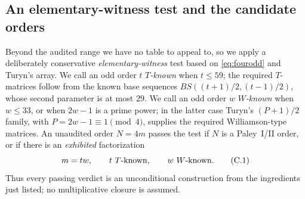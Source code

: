 \documentclass[11pt]{article}
\begin{document}
\subsection{An elementary-witness test and the candidate orders}
\label{app:candidates}

Beyond the audited range we have no table to appeal to, so we apply a
deliberately conservative \emph{elementary-witness} test based on
\eqref{eq:fourodd} and Turyn's array.  We call an odd order \(t\)
\emph{\(T\)-known} when \(t\le59\); the required \(T\)-matrices follow
from the known base sequences
\(BS((t+1)/2,(t-1)/2)\), whose second parameter is at most \(29\).
We call an odd order \(w\) \emph{\(W\)-known} when \(w\le33\), or when
\(2w-1\) is a prime power; in the latter case Turyn's
\((P+1)/2\) family, with \(P=2w-1\equiv1\pmod4\), supplies the required
Williamson-type matrices.  An unaudited order \(N=4m\) passes the test
if \(N\) is a Paley~I/II order, or if there is an \emph{exhibited}
factorization
\[
        m=tw,\qquad t\ \hbox{\(T\)-known},\qquad
        w\ \hbox{\(W\)-known}.
        \tag{C.1}\label{eq:strictwitness}
\]
Thus every passing verdict is an unconditional construction from the
ingredients just listed; no multiplicative closure is assumed.
\end{document}
